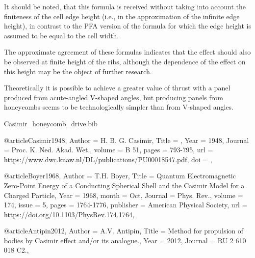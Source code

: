 \documentclass[twoside, 10pt, ptm]{article}
\def\myfilename{Casimir_honeycomb_drive}
\begin{document}
\begin{multicols}{2}
It should be noted, that this formula is received without taking
into account the finiteness of the cell edge height (i.e., in
the approximation of the infinite edge height), in contrast to the PFA
version of the formula for which the edge height is assumed to be equal
to the cell width.

The approximate agreement of these formulas indicates that the
effect should also be observed at finite height of the ribs, although
the dependence of the effect on this height may be the object of further
research.

Theoretically it is possible to achieve a greater value of thrust with a
panel produced from acute-angled V-shaped angles, but producing
panels from honeycombs seems to be technologically simpler than
from V-shaped angles.


\begin{filecontents}{\myfilename.bib}


@article{Casimir1948,
    Author = {H. B. G. Casimir},
    Title = {},
    Year = {1948},
    Journal = {Proc. K. Ned. Akad. Wet.},
    volume = {B 51},
    pages = {793-795},
    url = {https://www.dwc.knaw.nl/DL/publications/PU00018547.pdf},
    doi = {},
}


@article{Boyer1968,
    Author = {T.H. Boyer},
    Title = {Quantum Electromagnetic Zero-Point Energy of a Conducting Spherical Shell and the Casimir Model for a Charged Particle},
    Year = {1968},
    month = {Oct},
    Journal = {Phys. Rev.},
    volume = {174},
    issue = {5},
    pages = {1764-1776},
    publisher = {American Physical Society},
    url = {https://doi.org/10.1103/PhysRev.174.1764},
}


@article{Antipin2012,
    Author = {A.V. Antipin},
    Title = {Method for propulsion of bodies by Casimir effect and/or its analogue.},
    Year = {2012},
    Journal = {RU 2 610 018 C2.},
}


\end{filecontents}
\end{multicols}
\end{document}
